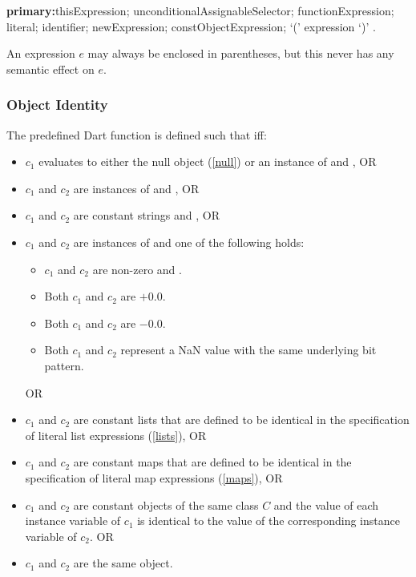 \documentclass{article}
\begin{document}
\begin{grammar}
{\bf primary:}thisExpression;
  \SUPER{} unconditionalAssignableSelector;
  functionExpression;
  literal;
  identifier;
  newExpression;
  constObjectExpression;
  `(' expression `)'
  .
\end{grammar}

\LMHash{}
An expression $e$ may always be enclosed in parentheses, but this never has any semantic effect on $e$.



\subsubsection{Object Identity}

\LMHash{}
The predefined Dart function  is defined such that  if{}f:
\begin{itemize}
\item $c_1$ evaluates to either the null object (\ref{null}) or an instance of  and , OR
\item $c_1$ and $c_2$ are instances of  and , OR
\item $c_1$ and $c_2$ are constant strings and , OR
\item $c_1$ and $c_2$ are instances of  and one of the following holds:
  \begin{itemize}
  \item $c_1$ and $c_2$ are non-zero and .
  \item Both $c_1$ and $c_2$ are $+0.0$.
  \item Both $c_1$ and $c_2$ are $-0.0$.
  \item Both $c_1$ and $c_2$ represent a NaN value with the same underlying bit pattern.
  \end{itemize}
 OR
\item $c_1$ and $c_2$ are constant lists that are defined to be identical in the specification of literal list expressions (\ref{lists}), OR
\item $c_1$ and $c_2$ are constant maps that are defined to be identical in the specification of literal map expressions (\ref{maps}), OR
\item $c_1$ and $c_2$ are constant objects of the same class $C$ and the value of each instance variable of $c_1$ is identical to the value of the corresponding instance variable of $c_2$. OR
\item $c_1$ and $c_2$ are the same object.
\end{itemize}
\end{document}
